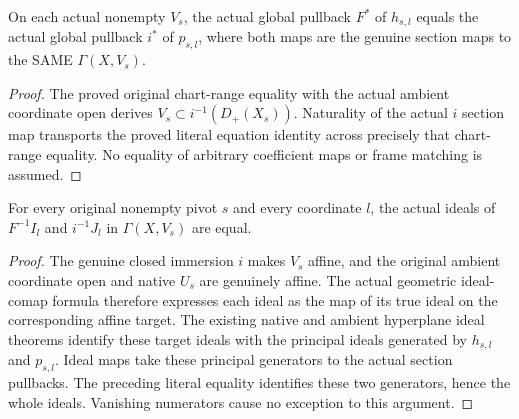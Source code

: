 \begin{lemma}
\label{lem:seven-original-native-hyperplane-both-global-pullbacks-route}
\leanok
{}
On each actual nonempty $V_s$, the actual global pullback $F^*$ of
$h_{s,l}$ equals the actual global pullback $i^*$ of $p_{s,l}$, where both
maps are the genuine section maps to the SAME $\Gamma(X,V_s)$.
\end{lemma}
\begin{proof}
The proved original chart-range equality with the actual ambient
coordinate open derives $V_s\subset i^{-1}(D_+(X_s))$. Naturality of the
actual $i$ section map transports the proved literal equation
identity across precisely that chart-range equality. No equality of
arbitrary coefficient maps or frame matching is assumed.
\end{proof}

\begin{lemma}
\label{lem:seven-original-native-hyperplane-ideals-affine-route}
\leanok
{}
For every original nonempty pivot $s$ and every coordinate $l$, the actual
ideals of $F^{-1}I_l$ and $i^{-1}J_l$ in $\Gamma(X,V_s)$ are equal.
\end{lemma}
\begin{proof}
The genuine closed immersion $i$ makes $V_s$ affine, and the original
ambient coordinate open and native $U_s$ are genuinely affine. The actual
geometric ideal-comap formula therefore expresses each ideal as the map
of its true ideal on the corresponding affine target. The existing native
and ambient hyperplane ideal theorems identify these target ideals with
the principal ideals generated by $h_{s,l}$ and $p_{s,l}$. Ideal maps take
these principal generators to the actual section pullbacks. The preceding
literal equality identifies these two generators, hence the whole ideals.
Vanishing numerators cause no exception to this argument.
\end{proof}

